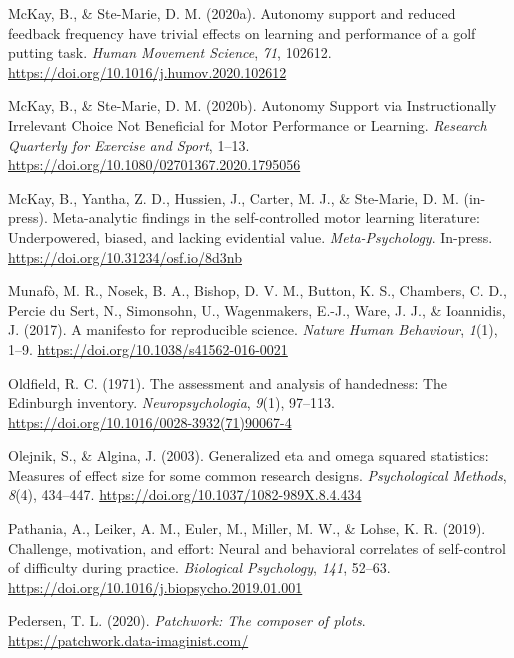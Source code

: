 \documentclass[
  man, donotrepeattitle,floatsintext]{apa7}
\newlength{\cslhangindent}
\newlength{\cslentryspacingunit} %
\newenvironment{CSLReferences}[2] %
 {%
  \setlength{\parindent}{0pt}
  \ifodd #1
  \let\oldpar\par
  \def\par{\hangindent=\cslhangindent\oldpar}
  \fi
  \setlength{\parskip}{#2\cslentryspacingunit}
 }%
 {}
\begin{document}
\begin{CSLReferences}{1}{0}
\leavevmode{}%
McKay, B., \& Ste-Marie, D. M. (2020a). Autonomy support and reduced feedback frequency have trivial effects on learning and performance of a golf putting task. \emph{Human Movement Science}, \emph{71}, 102612. \url{https://doi.org/10.1016/j.humov.2020.102612}

\leavevmode{}%
McKay, B., \& Ste-Marie, D. M. (2020b). Autonomy {Support} via {Instructionally} {Irrelevant} {Choice} {Not} {Beneficial} for {Motor} {Performance} or {Learning}. \emph{Research Quarterly for Exercise and Sport}, 1--13. \url{https://doi.org/10.1080/02701367.2020.1795056}

\leavevmode{}%
McKay, B., Yantha, Z. D., Hussien, J., Carter, M. J., \& Ste-Marie, D. M. (in-press). Meta-analytic findings in the self-controlled motor learning literature: {Underpowered}, biased, and lacking evidential value. \emph{Meta-Psychology}. In-press. \url{https://doi.org/10.31234/osf.io/8d3nb}

\leavevmode{}%
Munafò, M. R., Nosek, B. A., Bishop, D. V. M., Button, K. S., Chambers, C. D., Percie du Sert, N., Simonsohn, U., Wagenmakers, E.-J., Ware, J. J., \& Ioannidis, J. (2017). A manifesto for reproducible science. \emph{Nature Human Behaviour}, \emph{1}(1), 1--9. \url{https://doi.org/10.1038/s41562-016-0021}

\leavevmode{}%
Oldfield, R. C. (1971). The assessment and analysis of handedness: The {Edinburgh} inventory. \emph{Neuropsychologia}, \emph{9}(1), 97--113. \url{https://doi.org/10.1016/0028-3932(71)90067-4}

\leavevmode{}%
Olejnik, S., \& Algina, J. (2003). Generalized eta and omega squared statistics: Measures of effect size for some common research designs. \emph{Psychological Methods}, \emph{8}(4), 434--447. \url{https://doi.org/10.1037/1082-989X.8.4.434}

\leavevmode{}%
Pathania, A., Leiker, A. M., Euler, M., Miller, M. W., \& Lohse, K. R. (2019). Challenge, motivation, and effort: {Neural} and behavioral correlates of self-control of difficulty during practice. \emph{Biological Psychology}, \emph{141}, 52--63. \url{https://doi.org/10.1016/j.biopsycho.2019.01.001}

\leavevmode{}%
Pedersen, T. L. (2020). \emph{Patchwork: The composer of plots}. \url{https://patchwork.data-imaginist.com/}


\end{CSLReferences}
\end{document}
